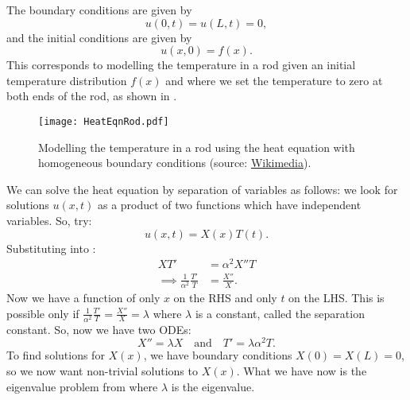 The boundary conditions are given by
\[
u(0,t) = u(L,t) = 0,
\]
and the initial conditions are given by
\[
u(x,0) = f(x).
\]
This corresponds to modelling the temperature in a rod given an initial temperature distribution $f(x)$ and where we set the temperature to zero at both ends of the rod, as shown in .

\begin{figure}[!ht]
	\centering
	\texttt{[image: HeatEqnRod.pdf]}
	\caption{Modelling the temperature in a rod using the heat equation with homogeneous boundary conditions (source: \href{https://commons.wikimedia.org/wiki/File:Temp_Rod_homobc.svg}{Wikimedia}).}
	\label{fig:heateqnrod}
\end{figure}

We can solve the heat equation by separation of variables as follows: we look for solutions $u(x,t)$ as a product of two functions which have independent variables. So, try:
\begin{equation}\label{eq5.2}
	u(x,t) = X(x) T(t).
\end{equation}
Substituting  into :
\begin{align*}
	XT' &= \alpha^2 X''T \\
	\implies \frac{1}{\alpha^2} \frac{T'}{T} &= \frac{X''}{X}.
\end{align*}
Now we have a function of only $x$ on the RHS and only $t$ on the LHS. This is possible only if $\frac{1}{\alpha^2} \frac{T'}{T} = \frac{X''}{X} = \lambda$ where $\lambda$ is a constant, called the separation constant. So, now we have two ODEs:
\[
X'' = \lambda X \quad\text{and}\quad T' = \lambda \alpha^2 T.
\]
To find solutions for $X(x)$, we have boundary conditions $X(0) = X(L) = 0$, so we now want non-trivial solutions to $X(x)$. What we have now is the eigenvalue problem from  where $\lambda$ is the eigenvalue.

